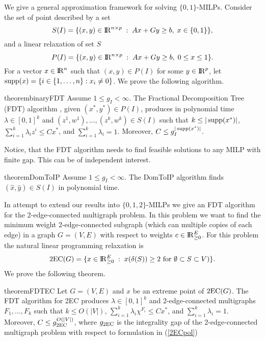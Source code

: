 We give a general approximation framework for solving $\{0,1\}$-MILPs.  Consider the set of point described by a set 
\begin{equation}
S(I)= \{(x,y)\in {\rm I\!R}^{n\times p}\;:\; Ax+Gy\geq b,\; x\in \{0,1\}\},  \label{S'} 
\end{equation}
and a linear relaxation of set $S$
\begin{equation}
P(I) = \{(x,y)\in {\rm I\!R}^{n\times p}\;:\; Ax+Gy\geq b,\; 0 \leq x\leq 1\}. \label{P'}
\end{equation}
For a vector $x\in {\rm I\!R}^n$ such that $(x,y)\in P(I)$ for some $y\in {\rm I\!R}^p$, let $\operatorname{supp}(x)= \{i \in \{1,\ldots,n\}: x_i \neq 0\}$.  We prove the following algorithm.

\begin{restatable}{theorem}{binaryFDT}
	\label{binaryFDT}
	Assume $1\leq g_I 	<\infty$. 	
	The Fractional Decomposition Tree (FDT) algorithm , given $(x^*,y^*)\in P(I)$, produces in polynomial time $\lambda\in [0,1]^k$ and $(z^1,w^1),\ldots,(z^k,w^k) \in S(I)$ such that $k\leq |\operatorname{supp}(x^*)|$, $\sum_{i=1}^{k}\lambda_i z^i\leq Cx^*$, and $\sum_{i=1}^{k}\lambda_i = 1$. Moreover, $C\leq g_I^{|\operatorname{supp}(x^*)|}$.
\end{restatable}

Notice, that the FDT algorithm needs to find feasible solutions to any MILP with finite gap. This can be of independent interest.
\begin{restatable}{theorem}{DomToIP}
	\label{domtoIP}
	Assume $1\leq g_I < \infty$. The DomToIP algorithm finds $(\hat{x},\hat{y})\in S(I)$ in polynomial time.
\end{restatable}

In attempt to extend our results into $\{0,1,2\}$-MILPs we give an FDT algorithm for the 2-edge-connected multigraph problem. In this problem we want to find the minimum weight 2-edge-connected subgraph (which can multiple copies of each edge) in a graph $G=(V,E)$ with respect to weights $c\in {\rm I\!R}^E_{\geq 0}$. For this problem the natural linear programming relaxation is
\begin{equation}\label{2ECpol}
\operatorname{2EC}(G)= \{x\in {\rm I\!R}_{\geq 0}^{E}\;:\; x(\delta(S))\geq 2 \text{ for $\emptyset \subset S\subset V$})\}.\end{equation}
We prove the following theorem.

\begin{restatable}{theorem}{FDTEC}
	\label{FDT2EC}
	Let $G=(V,E)$ and $x$ be an extreme point of  $\operatorname{2EC}(G)$. The FDT algorithm for 2EC produces $\lambda\in [0,1]^k$ and 2-edge-connected multigraphs $F_1,\ldots,F_k$ such that $k\leq O(|V|)$, $\sum_{i=1}^{k}\lambda_i \chi^{F_i}\leq Cx^*$, and $\sum_{i=1}^{k}\lambda_i = 1$. Moreover, $C\leq g_{\operatorname{2EC}}^{O(|V|)}$, where $g_{\operatorname{2EC}}$ is the integrality gap of the 2-edge-connected multigraph problem with respect to formulation in (\ref{2ECpol}) 
\end{restatable}

